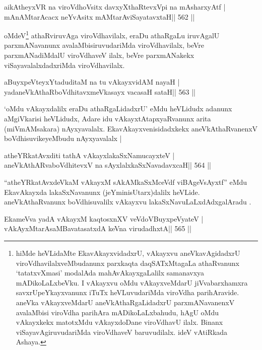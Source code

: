 \begin{shl}
aikAtheyxVR na viroVdhoV\s sitx davxyXthaRtevxV\s pi na mAsharxyAtf |
mAnAMtarAcacx neYvAsitx mAMtarAviSayatavxtaH\hfill || 562 ||
\end{shl}

\begin{artha}
oMdeV\footnote{hiMde heVLidaMte EkavAkayxvidadxrU, vAkayxvu
aneVkavAgidadxrU viroVdhavilalxveMbudanunx parxkaqta daqSATxMtagaLa
athaRvanunx `tatatxvXmasi' modalAda mahAvAkayxgaLalilx samanavxya
mADikoLaLxbeVku. I vAkayxvu oMdu vAkayxveMdarU jiVvabarxhamxra
savxrUpeYkayxvanunx iTuTx heVLuvudariMda viroVdha parihAravide.
aneVka vAkayxveMdarU aneVkAthaRgaLidadxrU parxmANavanenxV avalaMbisi
viroVdha parihAra mADikoLaLxbahudu, hAgU oMdu vAkayxkekx matotxMdu
vAkayxdoDane viroVdhavU ilalx. Binanx viSayavAgiruvudariMda
viroVdhaveV baruvudilalx. ideV vAtiRkada Ashaya.} athaRviruvAga viroVdhavilalx, eraDu athaRgaLu iruvAgalU
parxmANavanunx avalaMbisiruvudariMda viroVdhavilalx, beVre
parxmANadiMdalU viroVdhaveV ilalx, beVre parxmANakekx
viSayavalalxdadxriMda viroVdhavilalx.
\end{artha}

\begin{shl}
aBuyxpeVteyxYtaduditaM na tu vAkayxvidAM nayaH |
yadaneVkAthaRboVdhitavxmeVkasayx vacasaH sataH\hfill || 563 ||
\end{shl}

\begin{artha}
`oMdu vAkayxdalilx eraDu athaRgaLidadxrU' eMdu heVLidudx adanunx
aMgiVkarisi heVLidudx, Adare idu vAkayxtAtapxyaRvanunx arita
(miVmAMsakara) nAyxyavalalx. EkavAkayxvenisidadxkekx
aneVkAthaRvanenxV boVdhisuvikeyeMbudu nAyxyavalalx |
\end{artha}



\begin{shl}
atheYRkatAvxditi tathA vAkayxlakaSxNamucayxteV |
aneVkAthARvaboVdhitevxV na sAyxlalxkaSxNavadavxcaH\hfill || 564 ||
\end{shl}

\begin{artha}
``atheYRkatAvxdeVkaM vAkayxM sAkAMkaSxMceVdf viBAgeVsAyxtf'' eMdu EkavAkayxda lakaSxNavanunx (jeYminisUtarx)dalilx heVLide. aneVkAthaRvanunx boVdhisuvalilx vAkayxvu lakaSxNavuLaLxdAdxgalAradu .
\end{artha}

\begin{shl}
EkameVva yadA vAkayxM kaqtosxnXV veVdoV\s BuyxpeVyateV |
vAkAyxMtarAsaMBavatasatxdA keVna virudadhxtA\hfill || 565 ||
\end{shl}

